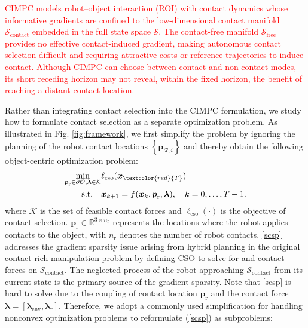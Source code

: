 \textcolor{red}{CIMPC models robot--object interaction (ROI) with contact dynamics whose informative gradients are confined to the low-dimensional contact manifold $\mathcal{S}_{\text{contact}}$ embedded in the full state space $\mathcal{S}$. The contact-free manifold $\mathcal{S}_{\text{free}}$ provides no effective contact-induced gradient, making autonomous contact selection difficult and requiring attractive costs or reference trajectories to induce contact. Although CIMPC can choose between contact and non-contact modes, its short receding horizon may not reveal, within the fixed horizon, the benefit of reaching a distant contact location.}

Rather than integrating contact selection into the CIMPC formulation, we study how to formulate contact selection as a separate optimization problem. As illustrated in Fig. \ref{fig:framework}, we first simplify the problem by ignoring the planning of the robot contact locations $\left \{ \boldsymbol{p}_{\mathcal{R}, i} \right \}$ and thereby obtain the following object-centric optimization problem:
\begin{equation}
 \begin{aligned}
 \min_{\boldsymbol{p}_{\text{r}} \in \partial \mathcal{O}, \boldsymbol{\lambda} \in \mathcal{K}} &
 \ell_{\text{cso}}(\boldsymbol{x}_{\textcolor{red}{T}}) \\
 \text{s.t.} \quad
 & \boldsymbol{x}_{k+1} = f(\boldsymbol{x}_k, \boldsymbol{p}_{\text{r}}, \boldsymbol{\lambda}),
 \quad k = 0, \dots, T-1.
 \end{aligned}\label{scsp}
\end{equation}
where $\mathcal{K}$ is the set of feasible contact forces and $\ell_{\text{cso}}(\cdot)$ is the objective of contact selection. $\boldsymbol{p}_{\text{r}} \in \mathbb{R}^{3 \times n_{\text{r}}}$ represents the locations where the robot applies contacts to the object, with $n_{\text{r}}$ denotes the number of robot contacts. \eqref{scsp} addresses the gradient sparsity issue arising from hybrid planning in the original contact-rich manipulation problem by defining CSO to solve for  and contact forces on $\mathcal{S}_{\text{contact}}$. The neglected process of the robot approaching $\mathcal{S}_{\text{contact}}$ from its current state is the primary source of the gradient sparsity. Note that \eqref{scsp} is hard to solve due to the coupling of contact location $\boldsymbol{p}_{\text{r}}$ and the contact force $\boldsymbol{\lambda}=\left [ \boldsymbol{\lambda}_{\text{env}}, \boldsymbol{\lambda}_{\text{r}} \right ]$. Therefore, we adopt a commonly used simplification for handling nonconvex optimization problems to reformulate (\ref{scsp}) as subproblems:
